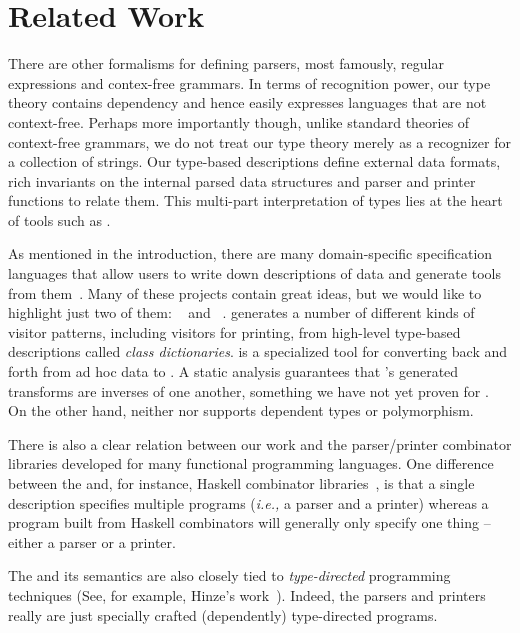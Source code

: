 \section{Related Work}
\label{sec:related}

There are other formalisms for
defining parsers, most famously, regular expressions and contex-free
grammars.  In terms of recognition power, our type theory contains
dependency and hence easily expresses languages that are not
context-free.  Perhaps more importantly though, unlike
standard theories of context-free grammars, we do not treat our type
theory merely as a recognizer for a collection of strings.  Our
type-based descriptions define external data formats, rich invariants 
on the internal parsed data structures and parser and printer
functions to relate them.  This
multi-part interpretation of types lies at the heart of 
tools such as \pads{}.

As mentioned in the introduction, there are many domain-specific
specification languages that allow users to write down descriptions
of data and generate tools from them~\cite{gpce02,lieberherr+:class-dictionaries,sigcomm00,fisher+:pads,mandelbaum+:padsml,xsugar2005}.  Many of these projects contain great ideas, 
but we would like to highlight just two of them:
\demeter~\cite{lieberherr+:class-dictionaries} and 
\xsugar~\cite{xsugar2005}.  \demeter{} generates a number of different kinds of visitor patterns, including visitors for printing, from high-level 
type-based descriptions called {\em class dictionaries}.  \xsugar{}
is a specialized tool for converting back and forth from ad hoc data
to \xml.  A static analysis guarantees that \xsugar{}'s generated
transforms are inverses of one another, something we have not yet proven
for \ddc{}.  On the other hand, neither \demeter{} nor \xsugar{} supports
dependent types or polymorphism.

There is also a clear relation between our work and the parser/printer
combinator libraries developed for many functional programming languages.
One difference between the \ddc{} and, for instance, Haskell
combinator libraries~\cite{hutton+:parser-combinators,wadler99prettier}, is that a single \ddc{} description specifies
multiple programs ({\em i.e.,} a parser and a printer) whereas
a program built from Haskell combinators will generally only specify 
one thing -- either a parser or a printer.  

The \ddc{} and its semantics are also closely tied to 
{\em type-directed} programming techniques
(See, for example, Hinze's work~\cite{hinze:generic}).
Indeed, the \ddc{} parsers and printers really are just
specially crafted (dependently) type-directed programs.


